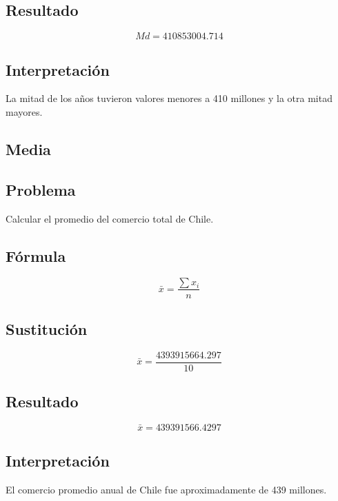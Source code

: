 \documentclass[12pt]{article}
\begin{document}
\subsection*{Resultado}

\[
Md = 410853004.714
\]

\subsection*{Interpretación}

La mitad de los años tuvieron valores menores a 410 millones y la otra mitad mayores.


\subsection{Media}

\subsection*{Problema}

Calcular el promedio del comercio total de Chile.

\subsection*{Fórmula}

\[
\bar{x}=\frac{\sum x_i}{n}
\]

\subsection*{Sustitución}

\[
\bar{x}=\frac{4393915664.297}{10}
\]

\subsection*{Resultado}

\[
\bar{x}=439391566.4297
\]

\subsection*{Interpretación}

El comercio promedio anual de Chile fue aproximadamente de 439 millones.

\end{document}
